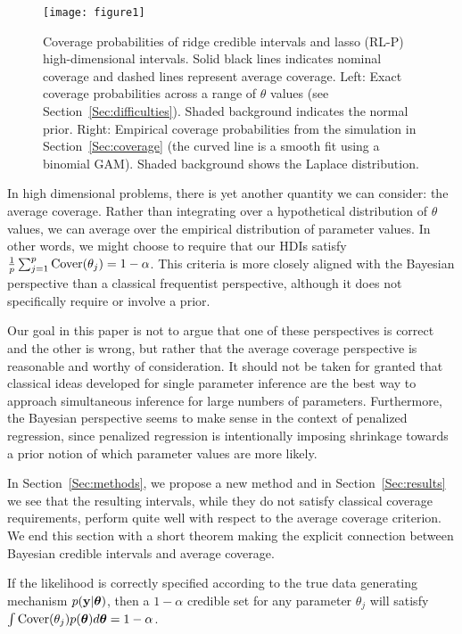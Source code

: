 \begin{figure}[htb!]
  \begin{center}
    \texttt{[image: figure1]}
    \caption{\label{fig:1}
      Coverage probabilities of ridge credible intervals and lasso (RL-P) high-dimensional intervals. Solid black lines indicates nominal coverage and dashed lines represent average coverage. Left: Exact coverage probabilities across a range of $\theta$ values (see Section~\ref{Sec:difficulties}). Shaded background indicates the normal prior. Right: Empirical coverage probabilities from the simulation in Section~\ref{Sec:coverage} (the curved line is a smooth fit using a binomial GAM). Shaded background shows the Laplace distribution.}
  \end{center}
\end{figure}

In high dimensional problems, there is yet another quantity we can consider: the average coverage. Rather than integrating over a hypothetical distribution of $\theta$ values, we can average over the empirical distribution of parameter values. In other words, we might choose to require that our HDIs satisfy $\tfrac{1}{p} \sum_{j=1}^p \textrm{Cover}(\theta_j) = 1-\alpha$. This criteria is more closely aligned with the Bayesian perspective than a classical frequentist perspective, although it does not specifically require or involve a prior.

Our goal in this paper is not to argue that one of these perspectives is correct and the other is wrong, but rather that the average coverage perspective is reasonable and worthy of consideration. It should not be taken for granted that classical ideas developed for single parameter inference are the best way to approach simultaneous inference for large numbers of parameters. Furthermore, the Bayesian perspective seems to make sense in the context of penalized regression, since penalized regression is intentionally imposing shrinkage towards a prior notion of which parameter values are more likely.

In Section~\ref{Sec:methods}, we propose a new method and in Section~\ref{Sec:results} we see that the resulting intervals, while they do not satisfy classical coverage requirements, perform quite well with respect to the average coverage criterion. We end this section with a short theorem making the explicit connection between Bayesian credible intervals and average coverage.

\begin{thm}
  \label{Thm:bcc}
  If the likelihood is correctly specified according to the true data generating mechanism $p(\mathbf{y} | \boldsymbol{\theta})$, then a $1-\alpha$ credible set for any parameter $\theta_j$ will satisfy $\int \textrm{Cover}(\theta_j)p(\boldsymbol{\theta}) d\boldsymbol{\theta} = 1 - \alpha$.
\end{thm}

